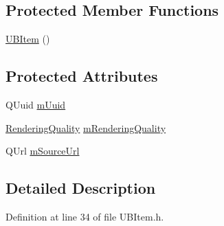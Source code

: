 \subsection*{Protected Member Functions}
\begin{DoxyCompactItemize}
\item 
\hyperlink{class_u_b_item_a8c38f2d78945907ece6dc5a585d7aa13}{U\-B\-Item} ()
\end{DoxyCompactItemize}
\subsection*{Protected Attributes}
\begin{DoxyCompactItemize}
\item 
Q\-Uuid \hyperlink{class_u_b_item_a4cb5aeff8000c84de48bf0a2ab6376ef}{m\-Uuid}
\item 
\hyperlink{class_u_b_item_a4d073757053cafbe4f26c17ea1224d53}{Rendering\-Quality} \hyperlink{class_u_b_item_a87b164f64911804513b9167e6d16a9cf}{m\-Rendering\-Quality}
\item 
Q\-Url \hyperlink{class_u_b_item_ad90f56dfda5ef98f0d5139bd49840faa}{m\-Source\-Url}
\end{DoxyCompactItemize}


\subsection{Detailed Description}


Definition at line 34 of file U\-B\-Item.\-h.



